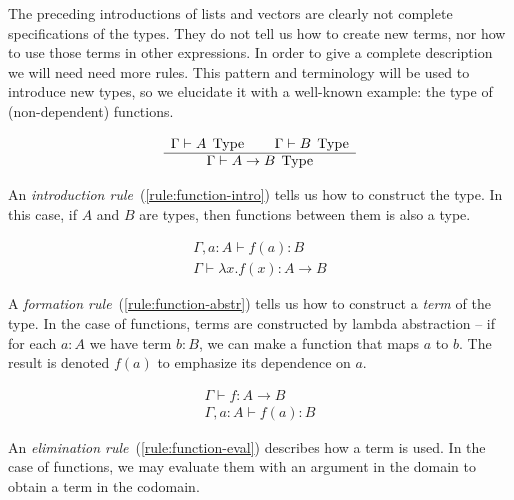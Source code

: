 The preceding introductions of lists and vectors are clearly not complete specifications
of the types. They do not tell us how to create new terms, nor how to use those
terms in other expressions. In order to give a complete description we will need
need more rules. This pattern and terminology will be used to introduce new
types, so we elucidate it with a well-known example: the type of (non-dependent)
functions.

\begin{equation}
  \begin{array}{c}
    \Gamma \vdash A \; \operatorname{Type} \qquad \Gamma \vdash B \; \operatorname{Type}\\
    \hline
    \Gamma \vdash A \rightarrow B \; \operatorname{Type}
  \end{array}
  \label{rule:function-intro}
\end{equation}

An \emph{introduction rule}~(\ref{rule:function-intro}) tells us how to construct
the type. In this case, if $A$ and $B$ are types, then functions between them is
also a type.

\begin{equation}
  \begin{array}{c}
    \Gamma, a : A \vdash f(a) : B\\
    \hline
    \Gamma \vdash \lambda x . f(x) : A \rightarrow B
  \end{array}
  \label{rule:function-abstr}
\end{equation}

A \emph{formation rule}~(\ref{rule:function-abstr}) tells us how to construct a
\emph{term} of the type. In the case of functions, terms are constructed by
lambda abstraction -- if for each $a:A$ we have term $b:B$, we can make a
function that maps $a$ to $b$. The result is denoted $f(a)$ to emphasize its
dependence on $a$.

\begin{equation}
  \begin{array}{c}
    \Gamma \vdash f : A \rightarrow B\\
    \hline
    \Gamma, a : A \vdash f(a) : B
  \end{array}
  \label{rule:function-eval}
\end{equation}

An \emph{elimination rule}~(\ref{rule:function-eval}) describes how a term is
used. In the case of functions, we may evaluate them with an argument in the
domain to obtain a term in the codomain.

